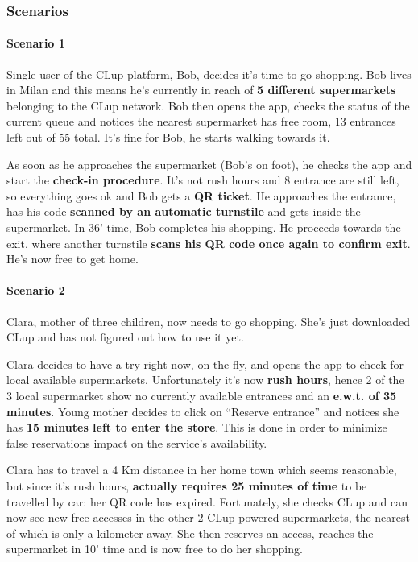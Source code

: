 \subsubsection{Scenarios}
\paragraph{Scenario 1}

Single user of the CLup platform, Bob, decides it's time to go shopping.
Bob lives in Milan and this means he's currently in reach of \textbf{5 different supermarkets} belonging to the CLup network. \newline
Bob then opens the app, checks the status of the current queue and notices the nearest supermarket has free room, 13 entrances left out of 55 total. It's fine for Bob, he starts walking towards it.

As soon as he approaches the supermarket (Bob's on foot), he checks the app and start the \textbf{check-in procedure}. It's not rush hours and 8 entrance are still left, so everything goes ok and Bob gets a \textbf{QR ticket}. He approaches the entrance, has his code \textbf{scanned by an automatic turnstile} and gets inside the supermarket.\newline
In 36' time, Bob completes his shopping. He proceeds towards the exit, where another turnstile \textbf{scans his QR code once again to confirm exit}. He's now free to get home.

\paragraph{Scenario 2}

Clara, mother of three children, now needs to go shopping. She's just downloaded CLup and has not figured out how to use it yet.

Clara decides to have a try right now, on the fly, and opens the app to check for local available supermarkets. 
\newline Unfortunately it's now \textbf{rush hours}, hence 2 of the 3 local supermarket show no currently available entrances and an \textbf{e.w.t. of 35 minutes}. Young mother decides to click on ``Reserve entrance'' and notices she has \textbf{15 minutes left to enter the store}. This is done in order to minimize false reservations impact on the service's availability.

Clara has to travel a 4 Km distance in her home town which seems reasonable, but since it's rush hours, \textbf{actually requires 25 minutes of time} to be travelled by car: her QR code has expired.\newline
Fortunately, she checks CLup and can now see new free accesses in the other 2 CLup powered supermarkets, the nearest of which is only a kilometer away. She then reserves an access, reaches the supermarket in 10' time and is now free to do her shopping.

